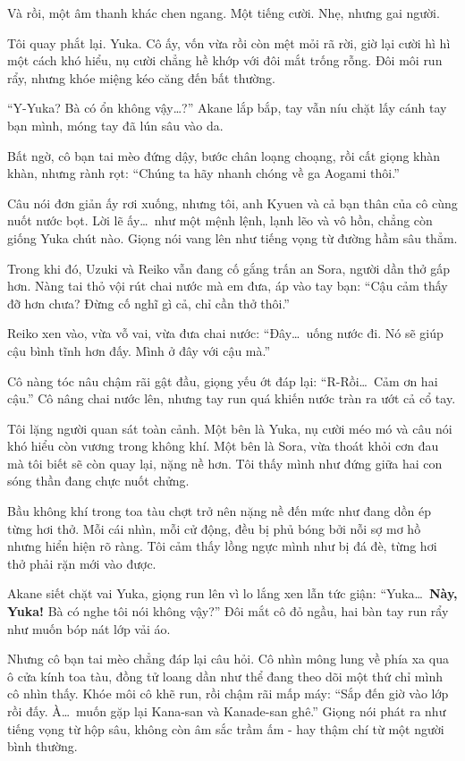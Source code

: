 \documentclass[../main.tex]{subfiles}
\begin{document}
Và rồi, một âm thanh khác chen ngang. Một tiếng cười. Nhẹ, nhưng gai người.


Tôi quay phắt lại. Yuka. Cô ấy, vốn vừa rồi còn mệt mỏi rã rời, giờ lại cười hì hì một cách khó hiểu, nụ cười chẳng hề khớp với đôi mắt trống rỗng. Đôi môi run rẩy, nhưng khóe miệng kéo căng đến bất thường.

``Y-Yuka? Bà có ổn không vậy\dots?'' Akane lắp bắp, tay vẫn níu chặt lấy cánh tay bạn mình, móng tay đã lún sâu vào da.

Bất ngờ, cô bạn tai mèo đứng dậy, bước chân loạng choạng, rồi cất giọng khàn khàn, nhưng rành rọt: ``Chúng ta hãy nhanh chóng về ga Aogami thôi.''

Câu nói đơn giản ấy rơi xuống, nhưng tôi, anh Kyuen và cả bạn thân của cô cùng nuốt nước bọt. Lời lẽ ấy\dots\ như một mệnh lệnh, lạnh lẽo và vô hồn, chẳng còn giống Yuka chút nào. Giọng nói vang lên như tiếng vọng từ đường hầm sâu thẳm.

Trong khi đó, Uzuki và Reiko vẫn đang cố gắng trấn an Sora, người dần thở gấp hơn. Nàng tai thỏ vội rút chai nước mà em đưa, áp vào tay bạn: ``Cậu cảm thấy đỡ hơn chưa? Đừng cố nghĩ gì cả, chỉ cần thở thôi.''

Reiko xen vào, vừa vỗ vai, vừa đưa chai nước: ``Đây\dots\ uống nước đi. Nó sẽ giúp cậu bình tĩnh hơn đấy. Mình ở đây với cậu mà.''

Cô nàng tóc nâu chậm rãi gật đầu, giọng yếu ớt đáp lại: ``R-Rồi\dots\ Cảm ơn hai cậu.'' Cô nâng chai nước lên, nhưng tay run quá khiến nước tràn ra ướt cả cổ tay.


Tôi lặng người quan sát toàn cảnh. Một bên là Yuka, nụ cười méo mó và câu nói khó hiểu còn vương trong không khí. Một bên là Sora, vừa thoát khỏi cơn đau mà tôi biết sẽ còn quay lại, nặng nề hơn. Tôi thấy mình như đứng giữa hai con sóng thần đang chực nuốt chửng.

Bầu không khí trong toa tàu chợt trở nên nặng nề đến mức như đang dồn ép từng hơi thở. Mỗi cái nhìn, mỗi cử động, đều bị phủ bóng bởi nỗi sợ mơ hồ nhưng hiển hiện rõ ràng. Tôi cảm thấy lồng ngực mình như bị đá đè, từng hơi thở phải rặn mới vào được.

Akane siết chặt vai Yuka, giọng run lên vì lo lắng xen lẫn tức giận: ``Yuka\dots\ \textbf{Này, Yuka!} Bà có nghe tôi nói không vậy?'' Đôi mắt cô đỏ ngầu, hai bàn tay run rẩy như muốn bóp nát lớp vải áo.

Nhưng cô bạn tai mèo chẳng đáp lại câu hỏi. Cô nhìn mông lung về phía xa qua ô cửa kính toa tàu, đồng tử loang dần như thể đang theo dõi một thứ chỉ mình cô nhìn thấy. Khóe môi cô khẽ run, rồi chậm rãi mấp máy: ``Sắp đến giờ vào lớp rồi đấy. À\dots\ muốn gặp lại Kana-san và Kanade-san ghê.'' Giọng nói phát ra như tiếng vọng từ hộp sâu, không còn âm sắc trầm ấm - hay thậm chí từ một người bình thường.
\end{document}
